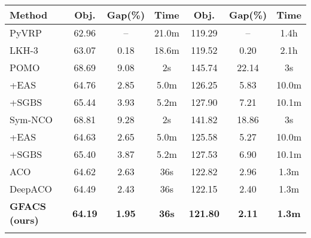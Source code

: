 \documentclass{article}
\begin{document}
\begin{table}[H]
\begin{minipage}[t]{0.49\textwidth}
\begin{tabular}{l ccc ccc}
\cline{2-7}
\textbf{Method} & Obj. & Gap(\%) & Time & Obj. & Gap(\%) & Time \\
\hline
PyVRP              & 62.96 & --    & 21.0m & 119.29 & --   & 1.4h \\
LKH-3              & 63.07 & 0.18  & 18.6m & 119.52 & 0.20 & 2.1h \\
\hline
POMO               & 68.69 & 9.08  & 2s    & 145.74 & 22.14 & 3s \\
\quad +EAS         & 64.76 & 2.85  & 5.0m  & 126.25 & 5.83  & 10.0m \\
\quad +SGBS        & 65.44 & 3.93  & 5.2m  & 127.90 & 7.21  & 10.1m \\
Sym\mbox{-}NCO     & 68.81 & 9.28  & 2s    & 141.82 & 18.86 & 3s \\
\quad +EAS         & 64.63 & 2.65  & 5.0m  & 125.58 & 5.27  & 10.0m \\
\quad +SGBS        & 65.40 & 3.87  & 5.2m  & 127.53 & 6.90  & 10.1m \\
\hline
ACO                & 64.62 & 2.63 & 36s & 122.82 & 2.96 & 1.3m \\
DeepACO            & 64.49 & 2.43 & 36s & 122.15 & 2.40 & 1.3m \\
\textbf{GFACS (ours)} & \textbf{64.19} & \textbf{1.95} & \textbf{36s} &
\textbf{121.80} & \textbf{2.11} & \textbf{1.3m} \\
\Xhline{1pt}
\end{tabular}
\end{minipage}
\end{table}
\restoregeometry

\end{document}
